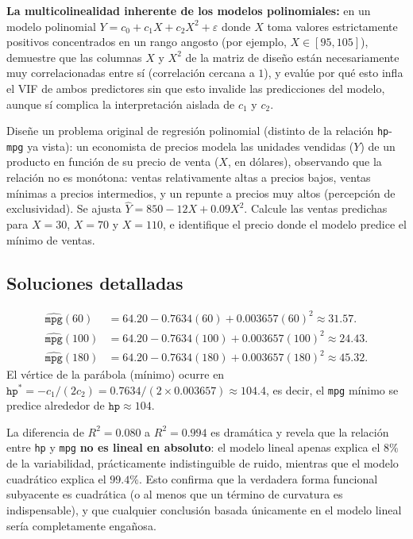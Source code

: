 \begin{problema}
	\label{prob:6954b16}
	\textbf{La multicolinealidad inherente de los modelos polinomiales:} en un modelo polinomial $Y=c_0+c_1X+c_2X^2+\varepsilon$ donde $X$ toma valores estrictamente positivos concentrados en un rango angosto (por ejemplo, $X\in[95,105]$), demuestre que las columnas $X$ y $X^2$ de la matriz de diseño están necesariamente muy correlacionadas entre sí (correlación cercana a $1$), y evalúe por qué esto infla el VIF de ambos predictores sin que esto invalide las predicciones del modelo, aunque sí complica la interpretación aislada de $c_1$ y $c_2$.
\end{problema}

\begin{problema}
	\label{prob:bc664de}
	Diseñe un problema original de regresión polinomial (distinto de la relación \texttt{hp}-\texttt{mpg} ya vista): un economista de precios modela las unidades vendidas ($Y$) de un producto en función de su precio de venta ($X$, en dólares), observando que la relación no es monótona: ventas relativamente altas a precios bajos, ventas mínimas a precios intermedios, y un repunte a precios muy altos (percepción de exclusividad). Se ajusta $\hat Y = 850 - 12X + 0.09X^2$. Calcule las ventas predichas para $X=30$, $X=70$ y $X=110$, e identifique el precio donde el modelo predice el mínimo de ventas.
\end{problema}

\subsection*{Soluciones detalladas}

\begin{solproblema}[prob:85eb17b]
	\begin{align}
		\hat{\texttt{mpg}}(60) &= 64.20-0.7634(60)+0.003657(60)^2 \approx 31.57.\\
		\hat{\texttt{mpg}}(100) &= 64.20-0.7634(100)+0.003657(100)^2 \approx 24.43.\\
		\hat{\texttt{mpg}}(180) &= 64.20-0.7634(180)+0.003657(180)^2 \approx 45.32.
	\end{align}
	El vértice de la parábola (mínimo) ocurre en $\texttt{hp}^*=-c_1/(2c_2)=0.7634/(2\times0.003657)\approx104.4$, es decir, el \texttt{mpg} mínimo se predice alrededor de $\texttt{hp}\approx104$.
\end{solproblema}

\begin{solproblema}
	La diferencia de $R^2=0.080$ a $R^2=0.994$ es dramática y revela que la relación entre \texttt{hp} y \texttt{mpg} \textbf{no es lineal en absoluto}: el modelo lineal apenas explica el $8\%$ de la variabilidad, prácticamente indistinguible de ruido, mientras que el modelo cuadrático explica el $99.4\%$. Esto confirma que la verdadera forma funcional subyacente es cuadrática (o al menos que un término de curvatura es indispensable), y que cualquier conclusión basada únicamente en el modelo lineal sería completamente engañosa.
\end{solproblema}

